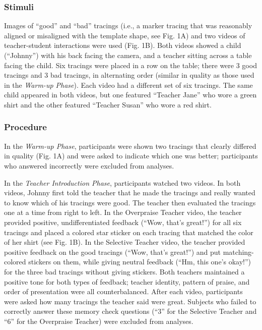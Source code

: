 \documentclass[10pt, letterpaper]{article}
\begin{document}
\subsubsection{Stimuli}\label{stimuli}

Images of ``good'' and ``bad'' tracings (i.e., a marker tracing that was
reasonably aligned or misaligned with the template shape, see Fig. 1A)
and two videos of teacher-student interactions were used (Fig. 1B). Both
videos showed a child (``Johnny'') with his back facing the camera, and
a teacher sitting across a table facing the child. Six tracings were
placed in a row on the table; there were 3 good tracings and 3 bad
tracings, in alternating order (similar in quality as those used in the
\textit{Warm-up Phase}). Each video had a different set of six tracings.
The same child appeared in both videos, but one featured ``Teacher
Jane'' who wore a green shirt and the other featured ``Teacher Susan''
who wore a red shirt.

\subsubsection{Procedure}\label{procedure}

In the \textit{Warm-up Phase}, participants were shown two tracings that
clearly differed in quality (Fig. 1A) and were asked to indicate which
one was better; participants who answered incorrectly were excluded from
analyses.

In the \textit{Teacher Introduction Phase}, participants watched two
videos. In both videos, Johnny first told the teacher that he made the
tracings and really wanted to know which of his tracings were good. The
teacher then evaluated the tracings one at a time from right to left. In
the Overpraise Teacher video, the teacher provided positive,
undifferentiated feedback (``Wow, that's great!'') for all six tracings
and placed a colored star sticker on each tracing that matched the color
of her shirt (see Fig. 1B). In the Selective Teacher video, the teacher
provided positive feedback on the good tracings (``Wow, that's great!'')
and put matching-colored stickers on them, while giving neutral feedback
(``Hm, this one's okay!'') for the three bad tracings without giving
stickers. Both teachers maintained a positive tone for both types of
feedback; teacher identity, pattern of praise, and order of presentation
were all counterbalanced. After each video, participants were asked how
many tracings the teacher said were great. Subjects who failed to
correctly answer these memory check questions (``3'' for the Selective
Teacher and ``6'' for the Overpraise Teacher) were excluded from
analyses.
\end{document}
